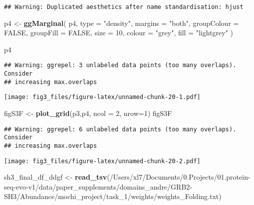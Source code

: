 \documentclass[
]{article}
\newenvironment{Shaded}{\begin{snugshade}}{\end{snugshade}}
\newcommand{\AttributeTok}[1]{\textcolor[rgb]{0.13,0.29,0.53}{#1}}
\newcommand{\ConstantTok}[1]{\textcolor[rgb]{0.56,0.35,0.01}{#1}}
\newcommand{\DecValTok}[1]{\textcolor[rgb]{0.00,0.00,0.81}{#1}}
\newcommand{\FunctionTok}[1]{\textcolor[rgb]{0.13,0.29,0.53}{\textbf{#1}}}
\newcommand{\NormalTok}[1]{#1}
\newcommand{\OtherTok}[1]{\textcolor[rgb]{0.56,0.35,0.01}{#1}}
\newcommand{\StringTok}[1]{\textcolor[rgb]{0.31,0.60,0.02}{#1}}
\begin{document}
\begin{verbatim}
## Warning: Duplicated aesthetics after name standardisation: hjust
\end{verbatim}

\begin{Shaded}
\begin{Highlighting}[]
\NormalTok{p4 }\OtherTok{\textless{}{-}} \FunctionTok{ggMarginal}\NormalTok{(}
\NormalTok{  p4,}
  \AttributeTok{type =} \StringTok{"density"}\NormalTok{,}
  \AttributeTok{margins =} \StringTok{"both"}\NormalTok{,}
  \AttributeTok{groupColour =} \ConstantTok{FALSE}\NormalTok{,}
  \AttributeTok{groupFill =} \ConstantTok{FALSE}\NormalTok{,}
  \AttributeTok{size =} \DecValTok{10}\NormalTok{,}
  \AttributeTok{colour =} \StringTok{"grey"}\NormalTok{,}
  \AttributeTok{fill =} \StringTok{"lightgrey"}
\NormalTok{)}

\NormalTok{p4}
\end{Highlighting}
\end{Shaded}

\begin{verbatim}
## Warning: ggrepel: 3 unlabeled data points (too many overlaps). Consider
## increasing max.overlaps
\end{verbatim}

\texttt{[image: fig3\_files/figure-latex/unnamed-chunk-20-1.pdf]}

\begin{Shaded}
\begin{Highlighting}[]
\NormalTok{figS3F }\OtherTok{\textless{}{-}} \FunctionTok{plot\_grid}\NormalTok{(p3,p4, }\AttributeTok{ncol =} \DecValTok{2}\NormalTok{, }\AttributeTok{nrow=}\DecValTok{1}\NormalTok{)}
\NormalTok{figS3F}
\end{Highlighting}
\end{Shaded}

\begin{verbatim}
## Warning: ggrepel: 6 unlabeled data points (too many overlaps). Consider
## increasing max.overlaps
\end{verbatim}

\texttt{[image: fig3\_files/figure-latex/unnamed-chunk-20-2.pdf]}

\begin{Shaded}
\begin{Highlighting}[]
\NormalTok{sh3\_final\_df\_ddgf }\OtherTok{\textless{}{-}} \FunctionTok{read\_tsv}\NormalTok{(}\StringTok{\textquotesingle{}/Users/xl7/Documents/0.Projects/01.protein{-}seq{-}evo{-}v1/data/paper\_supplements/domains\_andre/GRB2{-}SH3/Abundance/mochi\_project/task\_1/weights/weights\_Folding.txt\textquotesingle{}}\NormalTok{)}
\end{Highlighting}
\end{Shaded}
\end{document}
